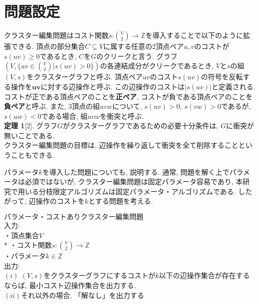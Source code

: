 \documentclass[10pt,a4j,twocolumn, dvipdfmx]{bxjsarticle}
\begin{document}
\section{問題設定}
クラスター編集問題はコスト関数$s$:$\binom{V}{2} \rightarrow \mathbb{Z}$を導入することで以下のように拡張できる.
頂点の部分集合$C \subseteq V$に属する任意の2頂点ペア$u,v$のコストが$s(uv) \ge 0$であるとき, $C$を$G$の$\textbf{クリーク}$と言う.
グラフ$(V,\{uv \in \binom{V}{2} | s(uv) > 0 \})$の各連結成分がクリークであるとき, $V$と$s$の組$(V,s)$を$\textbf{クラスターグラフ}$と呼ぶ.
頂点ペア$uv$のコスト$s(uv)$の符号を反転する操作を$\textbf{uvに対する辺操作}$と呼ぶ. この辺操作のコストは$|s(uv)|$と定義される.
コストが正である頂点ペアのことを\textbf{正ペア}, コストが負である頂点ペアのことを\textbf{負ペア}と呼ぶ.
また, 3頂点の組$uvw$について, $s(uv) > 0$, $s(vw) > 0$であるが, $s(uw) < 0$である場合, 組$uvw$を$\textbf{衝突}$と呼ぶ.\\

\textbf{定理 1}[2]. グラフ$G$が$\textbf{クラスターグラフ}$であるための必要十分条件は, $G$に衝突が無いことである.\\

クラスター編集問題の目標は, 辺操作を繰り返して衝突を全て削除することということもできる.\par
パラメータ$k$を導入した問題についても, 説明する. 通常, 問題を解く上でパラメータは必須ではないが, クラスター編集問題は固定パラメータ容易であり, 本研究で用いる分枝限定アルゴリズムは固定パラメータ・アルゴリズムである.
したがって, 辺操作のコストを$k$とする問題を考える.

\begin{screen}
    $\textbf{パラメータ・コストありクラスター編集問題}$ \\
    入力: \\
    ・頂点集合$V$ \\*
    ・コスト関数$s: \binom{V}{2} \rightarrow \mathbb{Z} $\\
    ・パラメータ$k \in \mathbb{Z}$ \\
    出力: \\
    $(i)$ $(V,s)$をクラスターグラフにするコストが$k$以下の辺操作集合が存在するならば,
    最小コスト辺操作集合を出力する. \\
    $(ii)$それ以外の場合, 「解なし」を出力する
\end{screen}
\end{document}
